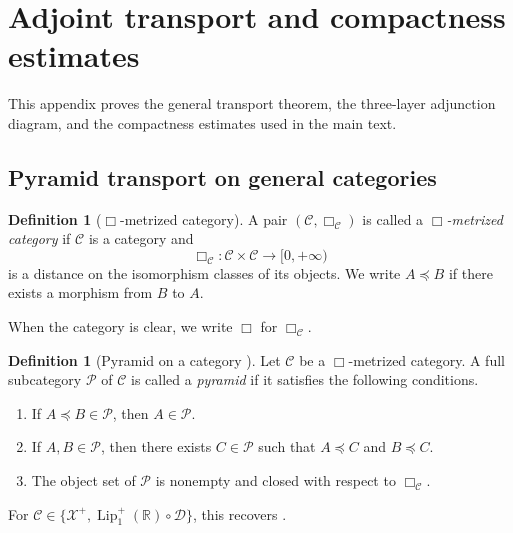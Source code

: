 \documentclass{amsart}
\theoremstyle{plain}
\theoremstyle{definition}
\newtheorem{definition}[theorem]{Definition}
\theoremstyle{remark}
\newcommand{\R}{\mathbb{R}}
\newcommand{\D}{\mathcal{D}}
\newcommand{\Xp}{\mathcal{X}^{+}}
\newcommand{\Lup}{\operatorname{Lip}^{+}_{1}(\R)}
\begin{document}
\appendix

\section{Adjoint transport and compactness estimates}
\label{sec:appendix}

This appendix proves the general transport theorem, the three-layer adjunction diagram, and the compactness estimates used in the main text.

\subsection{Pyramid transport on general categories}
\label{subsec:appendix-general-pyramid-transport}

\begin{definition}[$\Box$-metrized category]
\label{def:metrized-category}
A pair $(\mathcal C,\Box_{\mathcal C})$ is called a \emph{$\Box$-metrized category} if $\mathcal C$ is a category and
\[\Box_{\mathcal C}\colon\mathcal C\times\mathcal C\longrightarrow[0,+\infty)\]
is a distance on the isomorphism classes of its objects. We write $A\preceq B$ if there exists a morphism from $B$ to $A$.
\end{definition}
When the category is clear, we write $\Box$ for $\Box_{\mathcal C}$.

\begin{definition}[Pyramid on a category {\cite[Definition~5.1]{gds2}}]
\label{def:categorical-pyramid}
Let $\mathcal C$ be a $\Box$-metrized category. A full subcategory $\mathcal P$ of $\mathcal C$ is called a \emph{pyramid} if it satisfies the following conditions.
\begin{enumerate}[label=\textup{(\roman*)}]
\item If $A\preceq B\in\mathcal P$, then $A\in\mathcal P$.
\item If $A,B\in\mathcal P$, then there exists $C\in\mathcal P$ such that $A\preceq C$ and $B\preceq C$.
\item The object set of $\mathcal P$ is nonempty and closed with respect to $\Box_{\mathcal C}$.
\end{enumerate}
For $\mathcal C\in\{\Xp,\Lup\circ\D\}$, this recovers .
\end{definition}
\end{document}
